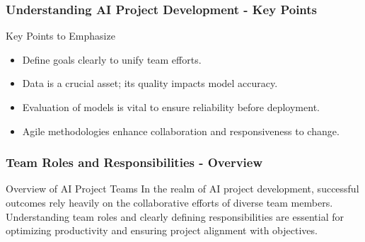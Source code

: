 \documentclass{beamer}
\begin{document}
\begin{frame}[fragile]
    \frametitle{Understanding AI Project Development - Key Points}
    \begin{block}{Key Points to Emphasize}
        \begin{itemize}
            \item Define goals clearly to unify team efforts.
            \item Data is a crucial asset; its quality impacts model accuracy.
            \item Evaluation of models is vital to ensure reliability before deployment.
            \item Agile methodologies enhance collaboration and responsiveness to change.
        \end{itemize}
    \end{block}
\end{frame}

\begin{frame}[fragile]
    \frametitle{Team Roles and Responsibilities - Overview}
    \begin{block}{Overview of AI Project Teams}
        In the realm of AI project development, successful outcomes rely heavily on the collaborative efforts of diverse team members. 
        Understanding team roles and clearly defining responsibilities are essential for optimizing productivity and ensuring project alignment with objectives.
    \end{block}
\end{frame}
\end{document}

